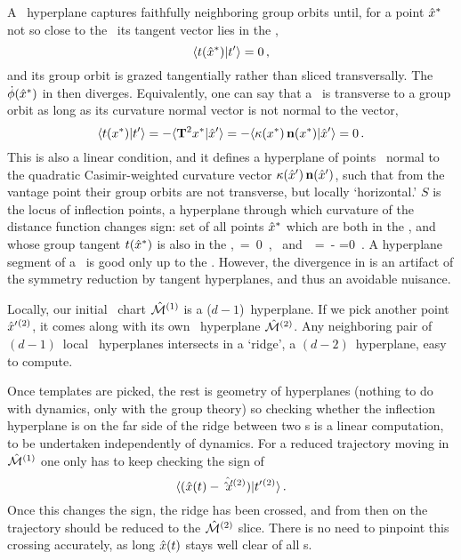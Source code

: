 A \slice\ hyperplane captures faithfully neighboring group orbits until,
for a point $\hat{x}^\ast$ not so close to the \template\ its tangent vector
lies in the \slice,
\[
\braket{\groupTan(\sspRSing)}{\sliceTan{}}= 0
\,,
\]
and its group orbit is grazed tangentially rather than sliced transversally.
The {\phaseVel} $\dot{{\bf \phi}}(\hat{x}^\ast)$ in
 then diverges. Equivalently,
one can say that a \slice\ is transverse to a group orbit as long as its
curvature normal vector  is not normal to the {\template} vector,
\[
\braket{\groupTan(\sspSing)}{\sliceTan{}}
 =
-\braket{\Lg^2\sspSing}{\slicep}
 =
-\braket{\kappa(\sspSing) \,{\bf n}(\sspSing)}{\slicep}
 = 0
\,.
\]
This is also a linear condition, and it defines a hyperplane of points
\sspSing\ normal to  the quadratic Casimir-weighted curvature vector
$\kappa({\hat{x}'}) \, {\bf n}({\hat{x}'})$, such that from the {\template} vantage
point their group orbits are not transverse, but locally `horizontal.'
{\Sset} $S$ is the locus of inflection points, a hyperplane through which
curvature of the distance function changes sign:
set of all points
$\hat{x}^\ast$ which are both in the {\slice}, and whose group tangent
$t(\hat{x}^\ast)$ is also in the  {\slice},
\beq
\braket{\sspRSing}{\sliceTan{}} \,=\, 0
    \,, \mbox{ and }
\braket{\groupTan(\sspRSing)}{\sliceTan{}}
 \,=\,
-
 =0
\,.
\label{sliceSingl0}
\eeq
A hyperplane segment of a \slice\ is good only up to the \sset. However,
the divergence in {\phaseVel}  is an artifact of the
symmetry reduction by tangent hyperplanes, and thus an avoidable
nuisance.

Locally, our initial \slice\ chart $\hat{\cal M}{}^{(1)}$ is a ($d\!-\!1$)\dmn\
hyperplane. If we pick another {\template} point ${\hat{x}'}{}^{(2)}$, it
comes along with its own \slice\ hyperplane $\hat{\cal M}{}^{(2)}$. Any
neighboring pair of $(d\!-\!1)$\dmn\ local \slice\ hyperplanes intersects
in a `ridge',
a $(d\!-\!2)$\dmn\ hyperplane, easy to compute.

Once templates are picked, the rest is geometry of hyperplanes (nothing
to do with dynamics, only with the group theory) so checking whether the
inflection hyperplane is on the far side of the ridge between two \slice
s is a linear computation, to be undertaken independently of dynamics.
For a reduced trajectory moving in $\hat{\cal M}{}^{(1)}$ one only has to keep checking
the sign of
\[
\braket{(\sspRed(\zeit)- \hat{\slicep{}}^{(2)})}{\sliceTan{}{}^{(2)}}
\,.
\]
Once this changes the sign, the ridge has been crossed, and from then on the
trajectory should be reduced to the $\hat{\cal M}{}^{(2)}$ slice. There is no need to
pinpoint this crossing accurately, as long $\hat{x}(t)$ stays well clear of
all \chartBord s.

